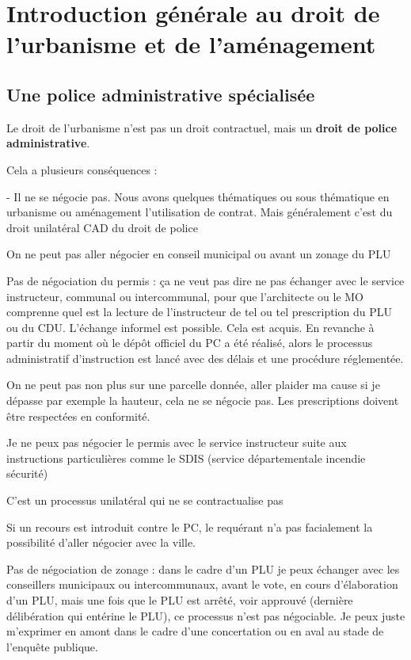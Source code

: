 \chapter[Introduction]{Introduction générale au droit de l'urbanisme et de l'aménagement}

	\section{Une police administrative spécialisée}
		
		Le droit de l’urbanisme n’est pas un droit contractuel, mais un \textbf{droit de police administrative}.
		
		Cela a plusieurs conséquences : 

		-	Il ne se négocie pas. Nous avons quelques thématiques ou sous thématique en urbanisme ou aménagement l’utilisation de contrat. Mais généralement c’est du droit unilatéral CAD du droit de police

		On ne peut pas aller négocier en conseil municipal ou avant un zonage du PLU

		Pas de négociation du permis : ça ne veut pas dire ne pas échanger avec le service instructeur, communal ou intercommunal, pour que l’architecte ou le MO comprenne quel est la lecture de l’instructeur de tel ou tel prescription du PLU ou du CDU. L’échange informel est possible. Cela est acquis. En revanche à partir du moment où le dépôt officiel du PC a été réalisé, alors le processus administratif d’instruction est lancé avec des délais et une procédure réglementée.

		On ne peut pas non plus sur une parcelle donnée, aller plaider ma cause si je dépasse par exemple la hauteur, cela ne se négocie pas. Les prescriptions doivent être respectées en conformité.

		Je ne peux pas négocier le permis avec le service instructeur suite aux instructions particulières comme le SDIS (service départementale incendie sécurité)

		C’est un processus unilatéral qui ne se contractualise pas

		Si un recours est introduit contre le PC, le requérant n’a pas facialement la possibilité d’aller négocier avec la ville.

		Pas de négociation de zonage : dans le cadre d’un PLU je peux échanger avec les conseillers municipaux ou intercommunaux, avant le vote, en cours d’élaboration d’un PLU, mais une fois que le PLU est arrêté, voir approuvé (dernière délibération qui entérine le PLU), ce processus n’est pas négociable. Je peux juste m’exprimer en amont dans le cadre d’une concertation ou en aval au stade de l’enquête publique.

